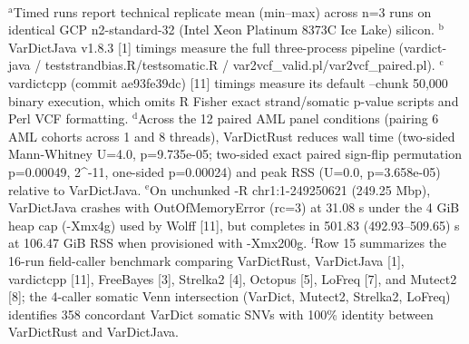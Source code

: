 \begin{table}[htbp]
\\[4pt]\footnotesize{$^{\text{a}}$Timed runs report technical replicate mean (min--max) across n=3 runs on identical GCP n2-standard-32 (Intel Xeon Platinum 8373C Ice Lake) silicon. $^{\text{b}}$VarDictJava v1.8.3 [1] timings measure the full three-process pipeline (vardict-java / teststrandbias.R/testsomatic.R / var2vcf\_valid.pl/var2vcf\_paired.pl). $^{\text{c}}$vardictcpp (commit ae93fe39dc) [11] timings measure its default --chunk 50,000 binary execution, which omits R Fisher exact strand/somatic p-value scripts and Perl VCF formatting. $^{\text{d}}$Across the 12 paired AML panel conditions (pairing 6 AML cohorts across 1 and 8 threads), VarDictRust reduces wall time (two-sided Mann-Whitney U=4.0, p=9.735e-05; two-sided exact paired sign-flip permutation p=0.00049, 2\textasciicircum{}-11, one-sided p=0.00024) and peak RSS (U=0.0, p=3.658e-05) relative to VarDictJava. $^{\text{e}}$On unchunked -R chr1:1-249250621 (249.25 Mbp), VarDictJava crashes with OutOfMemoryError (rc=3) at 31.08 s under the 4 GiB heap cap (-Xmx4g) used by Wolff [11], but completes in 501.83 (492.93--509.65) s at 106.47 GiB RSS when provisioned with -Xmx200g. $^{\text{f}}$Row 15 summarizes the 16-run field-caller benchmark comparing VarDictRust, VarDictJava [1], vardictcpp [11], FreeBayes [3], Strelka2 [4], Octopus [5], LoFreq [7], and Mutect2 [8]; the 4-caller somatic Venn intersection (VarDict, Mutect2, Strelka2, LoFreq) identifies 358 concordant VarDict somatic SNVs with 100\% identity between VarDictRust and VarDictJava.}
\end{table}
